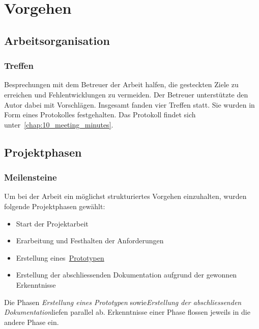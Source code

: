 
\chapter{Vorgehen}
\label{chap:procedure}

\section{Arbeitsorganisation}
\label{sec:organization}

\subsection{Treffen}
\label{subsec:meetings}

Besprechungen mit dem Betreuer der Arbeit halfen, die gesteckten Ziele zu
erreichen und Fehlentwicklungen zu vermeiden. Der Betreuer unterstützte den
Autor dabei mit Vorschlägen. Insgesamt fanden vier Treffen statt. Sie wurden in
Form eines Protokolles festgehalten. Das Protokoll findet sich
unter~\autoref{chap:10_meeting_minutes}.

\section{Projektphasen}
\label{sec:project_schedule}

\subsection{Meilensteine}
\label{subsec:milestones}

Um bei der Arbeit ein möglichst strukturiertes Vorgehen einzuhalten,
wurden folgende Projektphasen gewählt:

\begin{itemize}
    \item Start der Projektarbeit
    \item Erarbeitung und Festhalten der Anforderungen
    \item Erstellung eines~\hyperref[chap:prototype]{Prototypen}
    \item Erstellung der abschliessenden Dokumentation aufgrund der gewonnen
        Erkenntnisse
\end{itemize}

Die Phasen \textit{Erstellung eines Prototypen} sowie\textit{Erstellung der
    abschliessenden Dokumentation}liefen parallel ab. Erkenntnisse einer Phase
flossen jeweils in die andere Phase ein.

